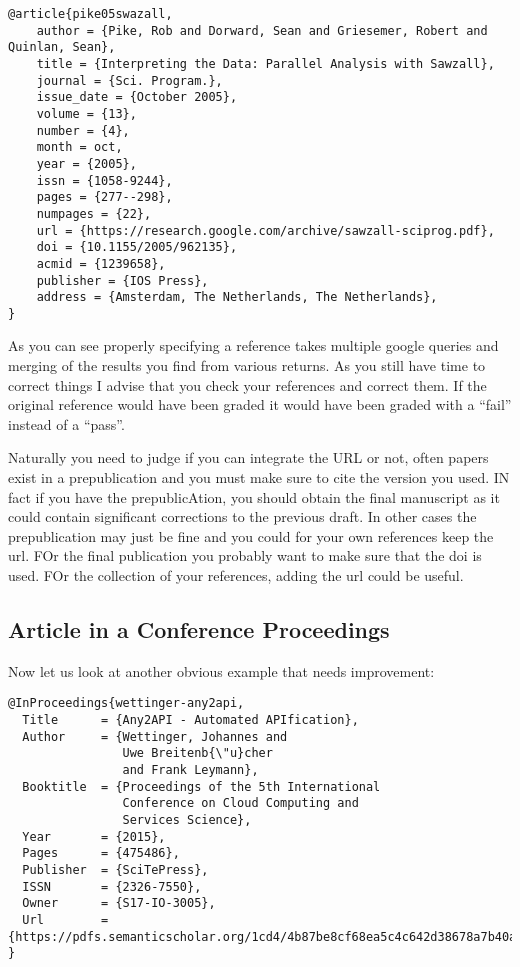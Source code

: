\begin{verbatim}
@article{pike05swazall,
    author = {Pike, Rob and Dorward, Sean and Griesemer, Robert and Quinlan, Sean},
    title = {Interpreting the Data: Parallel Analysis with Sawzall},
    journal = {Sci. Program.},
    issue_date = {October 2005},
    volume = {13},
    number = {4},
    month = oct,
    year = {2005},
    issn = {1058-9244},
    pages = {277--298},
    numpages = {22},
    url = {https://research.google.com/archive/sawzall-sciprog.pdf},
    doi = {10.1155/2005/962135},
    acmid = {1239658},
    publisher = {IOS Press},
    address = {Amsterdam, The Netherlands, The Netherlands},
}
\end{verbatim}

As you can see properly specifying a reference takes multiple google
queries and merging of the results you find from various returns. As
you still have time to correct things I advise that you check your
references and correct them. If the original reference would have been
graded it would have been graded with a ``fail'' instead of a ``pass''.

Naturally you need to judge if you can integrate the URL or not, often
papers exist in a prepublication and you must make sure to cite the
version you used. IN fact if you have the prepublicAtion, you should
obtain the final manuscript as it could contain significant
corrections to the previous draft. In other cases the prepublication
may just be fine and you could for your own references keep the
url. FOr the final publication you probably want to make sure that the
doi is used. FOr the collection of your references, adding the url
could be useful.

\subsection{Article in a Conference Proceedings}
\label{s:e:article-in-a-conference-proceedings}

Now let us look at another obvious example that needs improvement:

\begin{verbatim}
@InProceedings{wettinger-any2api,
  Title      = {Any2API - Automated APIfication},
  Author     = {Wettinger, Johannes and
                Uwe Breitenb{\"u}cher
                and Frank Leymann},
  Booktitle  = {Proceedings of the 5th International
                Conference on Cloud Computing and
                Services Science},
  Year       = {2015},
  Pages      = {475­486},
  Publisher  = {SciTePress},
  ISSN       = {2326-7550},
  Owner      = {S17-IO-3005},
  Url        = {https://pdfs.semanticscholar.org/1cd4/4b87be8cf68ea5c4c642d38678a7b40a86de.pdf}
}
\end{verbatim}

